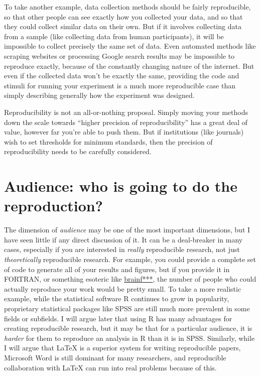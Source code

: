 \documentclass{book}
\begin{document}
To take another example, data collection methods should be fairly reproducible, so that other people can see exactly how you collected your data, and so that they could collect similar data on their own. But if it involves collecting data from a sample (like collecting data from human participants), it will be impossible to collect precisely the same set of data.  Even automated methods like scraping websites or processing Google search results may be impossible to reproduce exactly, because of the constantly changing nature of the internet.  But even if the collected data won't be exactly the same, providing the code and stimuli for running your experiment is a much more reproducible case than simply describing generally how the experiment was designed.

Reproducibility is not an all-or-nothing proposal. Simply moving your methods down the scale towards ``higher precision of reproducibility'' has a great deal of value, however far you're able to push them.  But if institutions (like journals) wish to set thresholds for minimum standards, then the precision of reproducibility needs to be carefully considered.
\section{Audience: who is going to do the reproduction?}
\label{sec-3-3}

The dimension of \emph{audience} may be one of the most important dimensions, but I have seen little if any direct discussion of it. It can be a deal-breaker in many cases, especially if you are interested in \emph{really} reproducible research, not just \emph{theoretically} reproducible research. For example, you could provide a complete set of code to generate all of your results and figures, but if you provide it in FORTRAN, or something esoteric like \href{http://en.wikipedia.org/wiki/Brainfuck}{brainf***}, the number of people who could actually reproduce your work would be pretty small.  To take a more realistic example, while the statistical software R continues to grow in popularity, proprietary statistical packages like SPSS are still much more prevalent in some fields or subfields. I will argue later that using R has many advantages for creating reproducible research, but it may be that for a particular audience, it is \emph{harder} for them to reproduce an analysis in R than it is in SPSS.  Similarly, while I will argue that \LaTeX{} is a superior system for writing reproducible papers, Microsoft Word is still dominant for many researchers, and reproducible collaboration with \LaTeX{} can run into real problems because of this.
\end{document}
